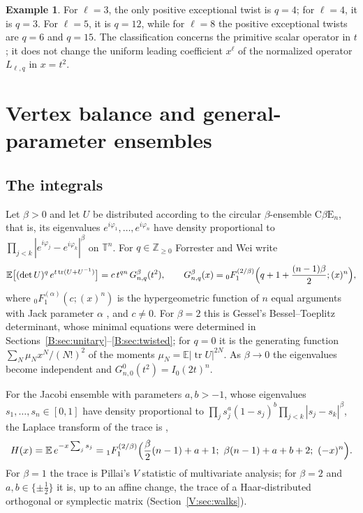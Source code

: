\documentclass[11pt,a4paper]{article}
\theoremstyle{definition}
\newtheorem{example}[theorem]{Example}
\theoremstyle{remark}
\newcommand{\Z}{\mathbb Z}
\newcommand{\T}{\mathbb T}
\newcommand{\E}{\mathbb E}
\DeclareMathOperator{\tr}{tr}
\numberwithin{equation}{section}
\begin{document}
\begin{example}
For $\ell=3$, the only positive exceptional twist is $q=4$; for
$\ell=4$, it is $q=3$.  For $\ell=5$, it is $q=12$, while for
$\ell=8$ the positive exceptional twists are $q=6$ and $q=15$.
The classification concerns the primitive scalar operator in $t$;
it does not change the uniform leading coefficient $x^\ell$ of the
normalized operator $L_{\ell,q}$ in $x=t^2$.
\end{example}

\section{Vertex balance and general-parameter ensembles}\label{V:overview}

\subsection{The integrals}
Let $\beta>0$ and let $U$ be distributed according to the circular $\beta$-ensemble $\mathrm{C}\beta\mathrm{E}_n$, that is, its eigenvalues $e^{i\varphi_1},\dots,e^{i\varphi_n}$ have density proportional to $\prod_{j<k}|e^{i\varphi_j}-e^{i\varphi_k}|^\beta$ on $\T^n$. For $q\in\Z_{\ge0}$ Forrester and Wei \cite[(2.7)]{FW26} write
\begin{equation}\label{V:eq:FW27}
\E\bigl[(\det U)^q\,e^{t\tr(U+U^{-1})}\bigr]=c\,t^{qn}\,G^\beta_{n,q}(t^2),\qquad G^\beta_{n,q}(x)={}_0F_1^{(2/\beta)}\Bigl(q+1+\frac{(n-1)\beta}2;(x)^n\Bigr),
\end{equation}
where ${}_0F_1^{(\alpha)}(c;(x)^n)$ is the hypergeometric function of $n$ equal arguments with Jack parameter $\alpha$ \cite{Kan93}, and $c\ne0$. For $\beta=2$ this is Gessel's Bessel--Toeplitz determinant, whose minimal equations were determined in Sections~\ref{B:sec:unitary}--\ref{B:sec:twisted}; for $q=0$ it is the generating function $\sum_N\mu_Nx^N/(N!)^2$ of the moments $\mu_N=\E|\tr U|^{2N}$. As $\beta\to0$ the eigenvalues become independent and $G^0_{n,0}(t^2)=I_0(2t)^n$.

For the Jacobi ensemble with parameters $a,b>-1$, whose eigenvalues $s_1,\dots,s_n\in[0,1]$ have density proportional to $\prod_js_j^a(1-s_j)^b\prod_{j<k}|s_j-s_k|^\beta$, the Laplace transform of the trace is \cite{Kan93}, \cite[(2.12)]{FK22}
\begin{equation}\label{V:eq:FK212}
H(x)=\E\,e^{-x\sum_js_j}={}_1F_1^{(2/\beta)}\Bigl(\frac\beta2(n-1)+a+1;\ \beta(n-1)+a+b+2;\ (-x)^n\Bigr).
\end{equation}
For $\beta=1$ the trace is Pillai's $V$ statistic of multivariate analysis; for $\beta=2$ and $a,b\in\{\pm\frac12\}$ it is, up to an affine change, the trace of a Haar-distributed orthogonal or symplectic matrix (Section~\ref{V:sec:walks}).
\end{document}

